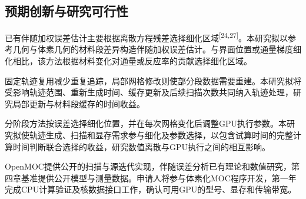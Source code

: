 \documentclass[UTF8, zihao=-4, fontset=none, a4paper]{ctexart}
\newcommand{\upcite}[1]{\textsuperscript{[#1]}}
\begin{document}
\subsection{预期创新与研究可行性}
已有伴随加权误差估计主要根据离散方程残差选择细化区域\upcite{24,27}。本研究拟以参考几何与体素几何的材料段差异构造伴随加权误差估计。与界面位置或通量梯度细化相比，该方法根据材料变化对通量或反应率的贡献选择细化区域。

固定轨迹复用减少重复追踪，局部网格修改则使部分段数据需要重建。本研究拟将受影响轨迹范围、重新生成时间、缓存更新及后续扫描次数共同纳入轨迹处理，研究局部更新与材料段缓存的时间收益。

分阶段方法按误差选择细化位置，并在每次网格变化后调整GPU执行参数。本研究拟使轨迹生成、扫描和显存需求参与细化及参数选择，以包含试算时间的完整计算时间判断联合选择的收益，研究数值离散与GPU执行之间的相互影响。

OpenMOC提供公开的扫描与源迭代实现，伴随误差分析已有理论和数值研究，第四章基准提供公开模型与测量数据。申请人将参与体素化MOC程序开发，第一年完成CPU计算验证及核数据接口工作，确认可用GPU的型号、显存和传输带宽。
\end{document}
